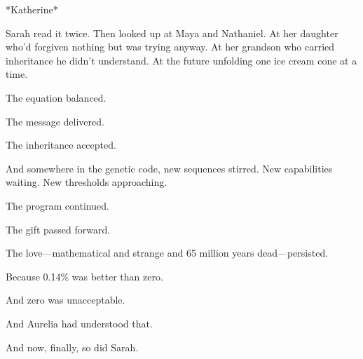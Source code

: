*Katherine*

Sarah read it twice. Then looked up at Maya and Nathaniel. At her daughter who'd forgiven nothing but was trying anyway. At her grandson who carried inheritance he didn't understand. At the future unfolding one ice cream cone at a time.

The equation balanced.

The message delivered.

The inheritance accepted.

And somewhere in the genetic code, new sequences stirred. New capabilities waiting. New thresholds approaching.

The program continued.

The gift passed forward.

The love—mathematical and strange and 65 million years dead—persisted.

Because 0.14\% was better than zero.

And zero was unacceptable.

And Aurelia had understood that.

And now, finally, so did Sarah.

